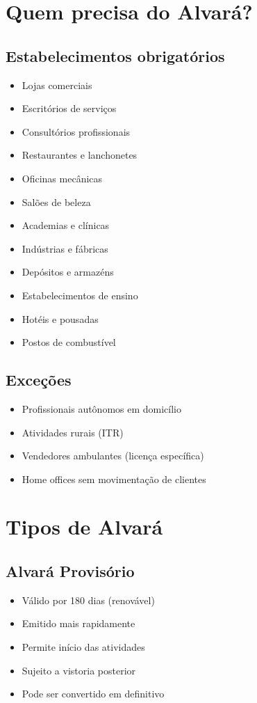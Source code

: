 \documentclass[12pt,a4paper]{article}
\begin{document}
\section{Quem precisa do Alvará?}

\subsection{Estabelecimentos obrigatórios}
\begin{itemize}
    \item Lojas comerciais
    \item Escritórios de serviços
    \item Consultórios profissionais
    \item Restaurantes e lanchonetes
    \item Oficinas mecânicas
    \item Salões de beleza
    \item Academias e clínicas
    \item Indústrias e fábricas
    \item Depósitos e armazéns
    \item Estabelecimentos de ensino
    \item Hotéis e pousadas
    \item Postos de combustível
\end{itemize}

\subsection{Exceções}
\begin{itemize}
    \item Profissionais autônomos em domicílio
    \item Atividades rurais (ITR)
    \item Vendedores ambulantes (licença específica)
    \item Home offices sem movimentação de clientes
\end{itemize}

\section{Tipos de Alvará}

\subsection{Alvará Provisório}
\begin{itemize}
    \item Válido por 180 dias (renovável)
    \item Emitido mais rapidamente
    \item Permite início das atividades
    \item Sujeito a vistoria posterior
    \item Pode ser convertido em definitivo
\end{itemize}
\end{document}
